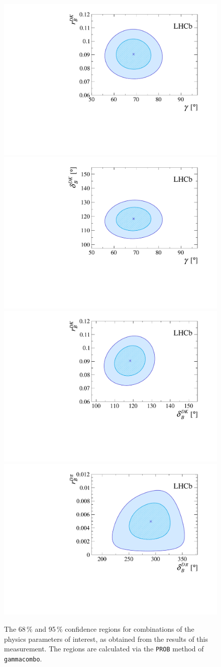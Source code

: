 \begin{figure}[tp]
    \centering
    \includegraphics[width=0.46\columnwidth]{figures/analysis/interpretation/2d_g_r_dk_paper.pdf}
    \includegraphics[width=0.46\columnwidth]{figures/analysis/interpretation/2d_g_d_dk_paper.pdf}
    \includegraphics[width=0.46\columnwidth]{figures/analysis/interpretation/2d_d_dk_r_dk_paper.pdf}
    \includegraphics[width=0.46\columnwidth]{figures/analysis/interpretation/2d_d_dpi_r_dpi_paper.pdf}
    \caption{The 68\,\% and 95\,\% confidence regions for combinations of the physics parameters of interest, as obtained from the results of this measurement. The regions are calculated via the \texttt{PROB} method of \texttt{gammacombo}.}
    \label{fig:2d_CL}
\end{figure}



